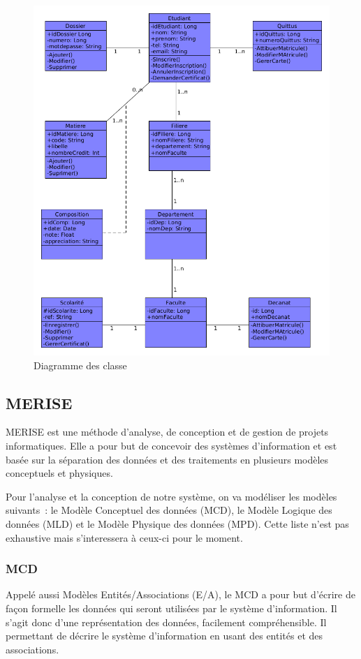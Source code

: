 \documentclass[12pt,a4paper]{article}
\begin{document}
	\begin{figure}[H]
		\centering
		\includegraphics[width=\textwidth]{./images/u_class_diag_1}
		\caption{Diagramme des classe}
		\label{fig:figure4}
	\end{figure}

	\newpage
	\subsection{MERISE}
	MERISE est une méthode d’analyse, de conception et de gestion de projets informatiques. Elle a pour but de concevoir des systèmes d’information et est basée sur la séparation des données et des traitements en plusieurs modèles conceptuels et physiques.
	
	Pour l’analyse et la conception de notre système, on va modéliser les modèles suivants : le Modèle Conceptuel des données (MCD), le Modèle Logique des données (MLD) et le Modèle Physique des données (MPD). Cette liste n'est pas exhaustive mais s'interessera à ceux-ci pour le moment.\\


	\subsubsection{MCD}
	Appelé aussi Modèles Entités/Associations (E/A), le MCD a pour but d'écrire de façon formelle les données qui seront utilisées par le système d'information. Il s'agit donc d'une représentation des données, facilement compréhensible. Il permettant de décrire le système d'information en usant des entités et des associations.
	
\end{document}
